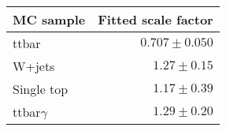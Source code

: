 \begin{tabular*}{\textwidth}{@{\extracolsep{\fill}}lr}
      \noalign{\smallskip}\hline\noalign{\smallskip}
      {\bf MC sample}           & Fitted scale factor        \\[-0.05cm] \hline
      ttbar &   $0.707 \pm 0.050$             \\
      W+jets &   $1.27 \pm 0.15$              \\
      Single top &   $1.17 \pm 0.39$              \\
      ttbar$\gamma$ &   $1.29 \pm 0.20$              \\ \hline
    \end{tabular*}
